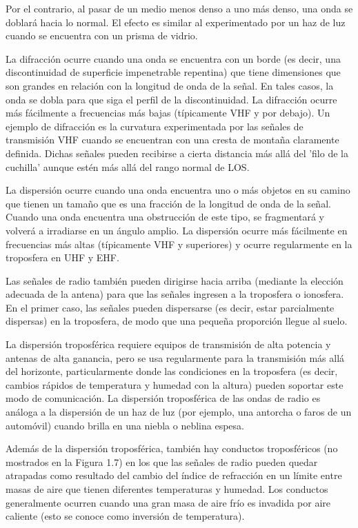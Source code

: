 Por el contrario, al pasar de un medio menos denso a uno más denso, una onda se doblará hacia lo normal. El efecto es similar al experimentado por un haz de luz cuando se encuentra con un prisma de vidrio.

La difracción ocurre cuando una onda se encuentra con un borde (es decir, una discontinuidad de superficie impenetrable repentina) que tiene dimensiones que son grandes en relación con la longitud de onda de la señal. En tales casos, la onda se dobla para que siga el perfil de la discontinuidad. La difracción ocurre más fácilmente a frecuencias más bajas (típicamente VHF y por debajo). Un ejemplo de difracción es la curvatura experimentada por las señales de transmisión VHF cuando se encuentran con una cresta de montaña claramente definida. Dichas señales pueden recibirse a cierta distancia más allá del 'filo de la cuchilla' aunque estén más allá del rango normal de LOS.

La dispersión ocurre cuando una onda encuentra uno o más objetos en su camino que tienen un tamaño que es una fracción de la longitud de onda de la señal. Cuando una onda encuentra una obstrucción de este tipo, se fragmentará y volverá a irradiarse en un ángulo amplio. La dispersión ocurre más fácilmente en frecuencias más altas (típicamente VHF y superiores) y ocurre regularmente en la troposfera en UHF y EHF.

Las señales de radio también pueden dirigirse hacia arriba (mediante la elección adecuada de la antena) para que las señales ingresen a la troposfera o ionosfera. En el primer caso, las señales pueden dispersarse (es decir, estar parcialmente dispersas) en la troposfera, de modo que una pequeña proporción llegue al suelo.

La dispersión troposférica requiere equipos de transmisión de alta potencia y antenas de alta ganancia, pero se usa regularmente para la transmisión más allá del horizonte, particularmente donde las condiciones en la troposfera (es decir, cambios rápidos de temperatura y humedad con la altura) pueden soportar este modo de comunicación. La dispersión troposférica de las ondas de radio es análoga a la dispersión de un haz de luz (por ejemplo, una antorcha o faros de un automóvil) cuando brilla en una niebla o neblina espesa.

Además de la dispersión troposférica, también hay conductos troposféricos (no mostrados en la Figura 1.7) en los que las señales de radio pueden quedar atrapadas como resultado del cambio del índice de refracción en un límite entre masas de aire que tienen diferentes temperaturas y humedad. Los conductos generalmente ocurren cuando una gran masa de aire frío es invadida por aire caliente (esto se conoce como inversión de temperatura).

